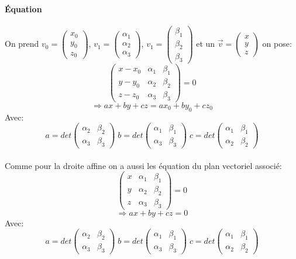 \documentclass[10pt,a4paper]{book}
\begin{document}
\paragraph{Équation}
On prend $v_0 = \begin{pmatrix} x_0 \\ y_0 \\ z_0 \end{pmatrix}$, $v_1 = \begin{pmatrix} \alpha_1 \\ \alpha_2 \\ \alpha_3 \end{pmatrix}$, $v_1 = \begin{pmatrix} \beta_1 \\ \beta_2 \\ \beta_3 \end{pmatrix}$ et un $\vec{v} = \begin{pmatrix} x \\ y \\ z \end{pmatrix}$ on pose:
\[\begin{pmatrix}
x - x_0 & \alpha_1 & \beta_1 \\
y - y_0 & \alpha_2 & \beta_2 \\
z - z_0 & \alpha_3 & \beta_3
\end{pmatrix} = 0
\]
\[\Rightarrow ax+by+cz = ax_0+by_0+cz_0\]
Avec:
\[a = det \begin{pmatrix} \alpha_2 & \beta_ 2 \\ \alpha_3 & \beta_3 \end{pmatrix} \;
b = det \begin{pmatrix} \alpha_1 & \beta_ 1 \\ \alpha_3 & \beta_3 \end{pmatrix} \;
c = det \begin{pmatrix} \alpha_1 & \beta_ 1 \\ \alpha_2 & \beta_2 \end{pmatrix}
\]
\\
Comme pour la droite affine on a aussi les équation du plan vectoriel associé:
\[\begin{pmatrix}
x & \alpha_1 & \beta_1 \\
y & \alpha_2 & \beta_2 \\
z & \alpha_3 & \beta_3
\end{pmatrix} = 0
\]
\[\Rightarrow ax+by+cz = 0\]
Avec:
\[a = det \begin{pmatrix} \alpha_2 & \beta_ 2 \\ \alpha_3 & \beta_3 \end{pmatrix} \;
b = det \begin{pmatrix} \alpha_1 & \beta_ 1 \\ \alpha_3 & \beta_3 \end{pmatrix} \;
c = det \begin{pmatrix} \alpha_1 & \beta_ 1 \\ \alpha_2 & \beta_2 \end{pmatrix}
\]
\end{document}
